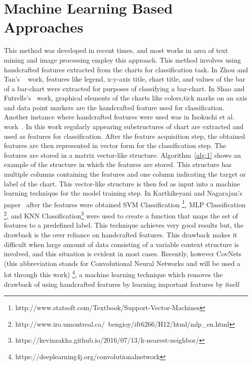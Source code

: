 \documentclass[12pt, a4paper,oneside]{report}
\begin{document}
\section{Machine Learning Based Approaches}
This method was developed in recent times, and most works in area of text mining and image processing employ this approach. This method 
involves using handcrafted features extracted from the charts for classification task. In Zhou and Tan's ~\cite{zhou2000bar} work, features like legend, x-y-axis title, chart title, and values of the bar of a bar-chart were extracted for purposes of classifying a bar-chart. In Shao and  Futrelle's~\cite{shao2005recognition} work, graphical elements of the charts like colors,tick marks on an axis and data point markers are the handcrafted feature used for classification. Another instance where handcrafted features were used was in Inokuchi et al. work~\cite{inokuchi2000apriori}. In this work regularly appearing substructures of chart are extracted and used as features for classification. After the feature acquisition step, the obtained features are then represented in vector form for the classification step. The features are stored in a matrix vector-like structure. Algorithm~\ref{alg:1} shows an example of the structure in which the features are stored. This structure has multiple columns containing the features and one column indicating the target or label of the chart. This vector-like structure is then fed as input into a machine learning technique for the model training step. In Karthikeyani and Nagarajan's paper~\cite{karthikeyani2012machine} after the features were obtained SVM Classification \footnote{http://www.statsoft.com/Textbook/Support-Vector-Machines}, MLP Classification
\footnote{http://www.iro.umontreal.ca/~bengioy/ift6266/H12/html/mlp\_en.html}, and  KNN Classification\footnote{
https://kevinzakka.github.io/2016/07/13/k-nearest-neighbor/} were used to create a function that maps the set of features to a predefined label. This technique achieves very good results but, the drawback is the over reliance on handcrafted features. This drawback makes it difficult when large amount of data consisting of a variable context structure is involved, and this situation is evident in most cases. Recently, however CovNets (this abbreviation stands for Convolutional Neural Networks and will be used a lot through this work) \footnote{https://deeplearning4j.org/convolutionalnetwork}, a machine learning technique which removes the drawback of using handcrafted features by learning important features by itself 
\end{document}
